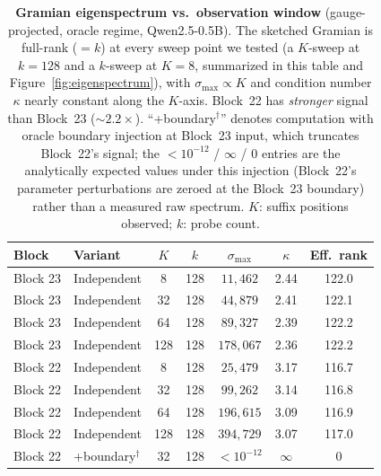 \documentclass{article}
\begin{document}
\begin{table}[t]
\centering
\caption{\textbf{Gramian eigenspectrum vs.\ observation window} (gauge-projected, oracle regime, Qwen2.5-0.5B).  The sketched Gramian is full-rank ($=k$) at every sweep point we tested (a $K$-sweep at $k{=}128$ and a $k$-sweep at $K{=}8$, summarized in this table and Figure~\ref{fig:eigenspectrum}), with $\sigma_{\max} \propto K$ and condition number $\kappa$ nearly constant along the $K$-axis.  Block~22 has \emph{stronger} signal than Block~23 ($\sim 2.2\times$).  ``+boundary$^{\dagger}$'' denotes computation with oracle boundary injection at Block~23 input, which truncates Block~22's signal; the ${<}10^{-12}$ / $\infty$ / $0$ entries are the analytically expected values under this injection (Block~22's parameter perturbations are zeroed at the Block~23 boundary) rather than a measured raw spectrum.  $K$: suffix positions observed; $k$: probe count.}
\label{tab:gramian}
\small
\begin{tabular}{@{}ll cc ccc@{}}
\toprule
\textbf{Block} & \textbf{Variant} & $K$ & $k$ & $\sigma_{\max}$ & $\kappa$ & \textbf{Eff.\ rank} \\
\midrule
Block 23 & Independent & 8 & 128 & $11{,}462$ & 2.44 & 122.0 \\
Block 23 & Independent & 32 & 128 & $44{,}879$ & 2.41 & 122.1 \\
Block 23 & Independent & 64 & 128 & $89{,}327$ & 2.39 & 122.2 \\
Block 23 & Independent & 128 & 128 & $178{,}067$ & 2.36 & 122.2 \\
\midrule
Block 22 & Independent & 8 & 128 & $25{,}479$ & 3.17 & 116.7 \\
Block 22 & Independent & 32 & 128 & $99{,}262$ & 3.14 & 116.8 \\
Block 22 & Independent & 64 & 128 & $196{,}615$ & 3.09 & 116.9 \\
Block 22 & Independent & 128 & 128 & $394{,}729$ & 3.07 & 117.0 \\
\midrule
Block 22 & +boundary$^{\dagger}$ & 32 & 128 & $< 10^{-12}$ & $\infty$ & 0 \\
\bottomrule
\end{tabular}
\end{table}
\end{document}
